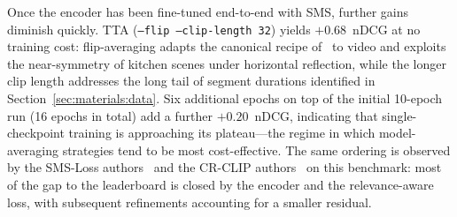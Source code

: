 Once the encoder has been fine-tuned end-to-end with SMS, further gains diminish quickly. TTA (\texttt{--flip --clip-length 32}) yields $+0.68$~nDCG at no training cost: flip-averaging adapts the canonical recipe of~\cite{krizhevsky2012alexnet} to video and exploits the near-symmetry of kitchen scenes under horizontal reflection, while the longer clip length addresses the long tail of segment durations identified in Section~\ref{sec:materials:data}. Six additional epochs on top of the initial 10-epoch run (16 epochs in total) add a further $+0.20$~nDCG, indicating that single-checkpoint training is approaching its plateau---the regime in which model-averaging strategies tend to be most cost-effective. The same ordering is observed by the SMS-Loss authors~\cite{wang2024symmetricmultisimilaritylossepickitchens100} and the CR-CLIP authors~\cite{he2025crclip} on this benchmark: most of the gap to the leaderboard is closed by the encoder and the relevance-aware loss, with subsequent refinements accounting for a smaller residual.
